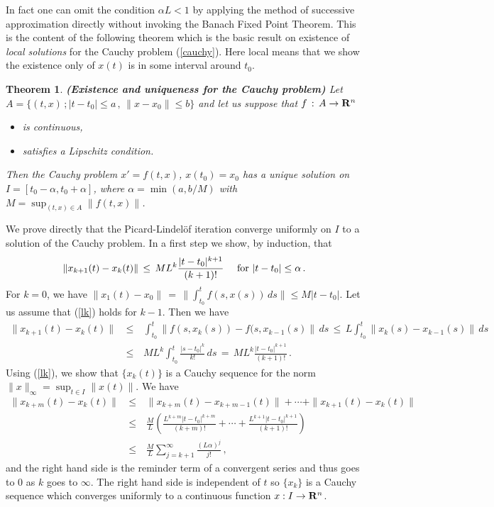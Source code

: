 \documentclass[12pt]{report}
\newcommand{\bR}{{\bf R}}
\newtheorem{theorem}{Theorem}[section]
\newcommand{\proof}{\noindent {\em Proof:~}}
\newcommand{\nn}{\nonumber}
\def\eqref#1{(\ref{#1})}
\def\to{\rightarrow}
\begin{document}
In fact one can omit the condition $\alpha L <1$ by applying the
method of successive approximation directly without invoking the
Banach Fixed Point Theorem.  This is the content of the following
theorem which is the basic result on existence of {\em local
solutions} for the Cauchy problem \eqref{cauchy}.  Here local means
that we show the existence only of $x(t)$ is in some interval around
$t_0$.

\begin{theorem}{\bf (Existence and uniqueness for the Cauchy problem)}
\label{loceu}
Let  $A= \{ (t,x) \,; |t-t_0| \le a \,,\, \|x-x_0\|
\le b\}$ and let us suppose that $f \,:\, A \to \bR^n$
\begin{itemize}
\item is continuous,
\item satisfies a Lipschitz condition. 
\end{itemize}
Then the Cauchy problem $x'=f(t,x)$, $x(t_0)=x_0$ has a unique
solution on $I=[t_0- \alpha, t_0 + \alpha]$, where $\alpha = \min( a,
b/M)$ with $M=\sup_{(t,x) \in A} \|f(t,x)\|$.
 \end{theorem}

\proof We prove
directly that the Picard-Lindel\"of iteration converge uniformly on
$I$ to a solution of the Cauchy problem.  
In a first step we show, by
induction, that
\begin{equation}\label{lk}
\|x_{k+1}(t) - x_k(t)\| \, \leq \,  M L^k \frac{|t-t_0|^{k+1}}{(k+1)!} 
\quad {\rm ~for~} |t-t_0| \le \alpha \,.
\end{equation} 
For $k=0$, we have $\|x_{1}(t) - x_0\| \,=\, \| \int_{t_0}^t f(s, x(s))\,ds \| 
\le M |t-t_0|$.  Let us assume that \eqref{lk} holds for $k-1$.  Then we have 
\begin{eqnarray}
\|x_{k+1}(t) - x_k(t)\| \,& \leq& \,  \int_{t_0}^t  
\| f(s, x_k(s)) - f(s, x_{k-1}(s) \| \,ds  
\, \leq \,  L  \int_{t_0}^t  
\| x_k(s) - x_{k-1}(s) \| \, ds  \nn \\ 
\,& \leq& \, M L^k  \int_{t_0}^t \frac{|s-t_0|^k}{k!} \, ds\,=\,  M L^k  
\frac{|t-t_0|^{k+1}}{(k+1)!} \,.
\end{eqnarray}  
Using \eqref{lk}, we show that $\{x_k(t)\}$ is a Cauchy sequence for
the norm $\|x\|_\infty = \sup_{t\in I}\|x(t)\|$. We have
\begin{eqnarray}\label{ko}  
\|x_{k+m}(t) - x_k(t)\| \,&\le&\, \|x_{k+m}(t) - x_{k+m-1}(t)\| + \cdots 
+ \|x_{k+1}(t) - x_k(t)\| \nn \\
\,&\le&\,  \frac{M}{L} \left( \frac{L^{k+m}|t-t_0|^{k+m}}{(k+m)!} + \cdots 
+ \frac{L^{k+1}  |t - t_0|^{k+1}}{(k+1)!} \right) \nn \\
 \,&\le&\, \frac{M}{L}  \sum_{j= k+1}^\infty \frac{(L\alpha)^j}{j!}\,,
\end{eqnarray}   
and the right hand side is the reminder term of a convergent series and
thus goes to $0$ as $k$ goes to $\infty$.  The right hand side is
independent of $t$ so $\{x_k\}$ is a Cauchy sequence which converges
uniformly to a continuous function $x: I \to \bR^n$.
\end{document}
